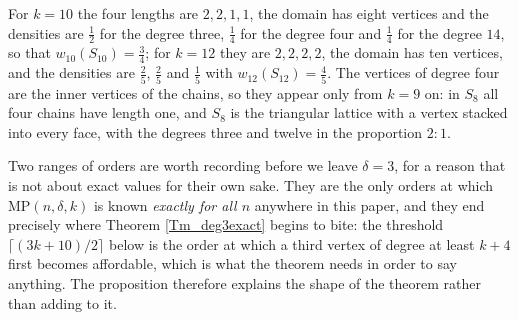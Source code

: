 \documentclass[12pt,a4paper]{article}%
\begin{document}
For $k=10$ the four lengths are $2,2,1,1$, the domain has eight vertices and the densities are
$\frac{1}{2}$ for the degree three, $\frac{1}{4}$ for the degree four and $\frac{1}{4}$ for the
degree $14$, so that $w_{10}(S_{10})=\frac{3}{4}$; for $k=12$ they are $2,2,2,2$, the domain has ten
vertices, and the densities are $\frac{2}{5}$, $\frac{2}{5}$ and $\frac{1}{5}$ with
$w_{12}(S_{12})=\frac{4}{5}$. The vertices of degree four are the inner vertices of the chains, so
they appear only from $k=9$ on: in $S_{8}$ all four chains have length one, and $S_{8}$ is the
triangular lattice with a vertex stacked into every face, with the degrees three and twelve in the
proportion $2{:}1$.





Two ranges of orders are worth recording before we leave $\delta =3$, for a reason that is not about
exact values for their own sake. They are the only orders at which $\mathrm{MP}(n,\delta ,k)$ is known
\emph{exactly for all $n$} anywhere in this paper, and they end precisely where Theorem
\ref{Tm_deg3exact} begins to bite: the threshold $\lceil (3k+10)/2\rceil $ below is the order at which a
third vertex of degree at least $k+4$ first becomes affordable, which is what the theorem needs in order to
say anything. The proposition therefore explains the shape of the theorem rather than adding to it.
\end{document}
